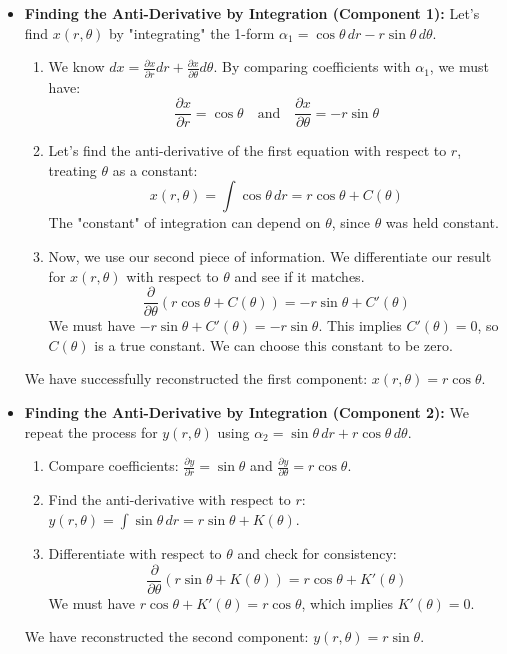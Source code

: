 \documentclass[12pt, letterpaper]{article}
\theoremstyle{definition}
\begin{document}
\begin{itemize}
		\item \textbf{Finding the Anti-Derivative by Integration (Component 1):}
		Let's find $x(r, \theta)$ by "integrating" the 1-form $\alpha_1 = \cos\theta \, dr - r\sin\theta \, d\theta$.
		\begin{enumerate}
			\item We know $dx = \frac{\partial x}{\partial r} dr + \frac{\partial x}{\partial \theta} d\theta$. By comparing coefficients with $\alpha_1$, we must have:
			\begin{equation*}
				\frac{\partial x}{\partial r} = \cos\theta \quad \text{and} \quad \frac{\partial x}{\partial \theta} = -r\sin\theta
			\end{equation*}
			\item Let's find the anti-derivative of the first equation with respect to $r$, treating $\theta$ as a constant:
			\begin{equation*}
				x(r, \theta) = \int \cos\theta \, dr = r\cos\theta + C(\theta)
			\end{equation*}
			The "constant" of integration can depend on $\theta$, since $\theta$ was held constant.
			\item Now, we use our second piece of information. We differentiate our result for $x(r,\theta)$ with respect to $\theta$ and see if it matches.
			\begin{equation*}
				\frac{\partial}{\partial \theta} \left( r\cos\theta + C(\theta) \right) = -r\sin\theta + C'(\theta)
			\end{equation*}
			We must have $-r\sin\theta + C'(\theta) = -r\sin\theta$. This implies $C'(\theta) = 0$, so $C(\theta)$ is a true constant. We can choose this constant to be zero.
		\end{enumerate}
		We have successfully reconstructed the first component: $x(r, \theta) = r\cos\theta$.
		
		\item \textbf{Finding the Anti-Derivative by Integration (Component 2):}
		We repeat the process for $y(r, \theta)$ using $\alpha_2 = \sin\theta \, dr + r\cos\theta \, d\theta$.
		\begin{enumerate}
			\item Compare coefficients: $\frac{\partial y}{\partial r} = \sin\theta$ and $\frac{\partial y}{\partial \theta} = r\cos\theta$.
			\item Find the anti-derivative with respect to $r$: $y(r, \theta) = \int \sin\theta \, dr = r\sin\theta + K(\theta)$.
			\item Differentiate with respect to $\theta$ and check for consistency:
			\begin{equation*}
				\frac{\partial}{\partial \theta} \left( r\sin\theta + K(\theta) \right) = r\cos\theta + K'(\theta)
			\end{equation*}
			We must have $r\cos\theta + K'(\theta) = r\cos\theta$, which implies $K'(\theta) = 0$.
		\end{enumerate}
		We have reconstructed the second component: $y(r, \theta) = r\sin\theta$.
		

\end{itemize}
\end{document}

